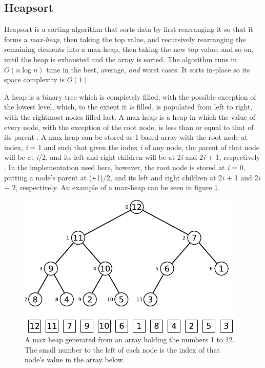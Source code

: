 \documentclass[12pt, a4paper]{article}
\begin{document}
\subsection{Heapsort}\label{sec:heapsort}

Heapsort is a sorting algorithm that sorts data by first rearranging it so that it forms a \emph{max-heap}, then taking the top value, and recursively rearranging the remaining elements into a max-heap, then taking the new top value, and so on, until the heap is exhausted and the array is sorted. The algorithm runs in $O(n\log n)$ time in the best, average, \emph{and} worst cases. It sorts in-place so its space complexity is $O(1)$ \autocite[129]{cormen01}.

A heap is a binary tree which is completely filled, with the possible exception of the lowest level, which, to the extent it  \emph{is} filled, is populated from left to right, with the rightmost nodes filled last. A max-heap is a heap in which the value of every node, with the exception of the root node, is less than or equal to that of its parent \autocite[127-129]{cormen01}. A max-heap can be stored as 1-based array with the root node at index, \emph{i} = 1 and such that given the index \emph{i} of any node, the parent of that node will be at \emph{i}/2, and its left and right children will be at 2\emph{i} and 2\emph{i} + 1, respectively \autocites[128]{cormen01}[148]{bentley:pearls}. In the implementation used here, however, the root node is stored at \emph{i} = 0, putting a node's parent at (\emph{i}-1)/2, and its left and right children at 2\emph{i} + 1 and 2\emph{i} + 2, respectively. An example of a max-heap can be seen in figure \ref{fig:heap}.


\begin{figure}
    \centering
    \includegraphics{heap.pdf}
    \caption{\label{fig:heap}A max heap generated from an array holding the numbers 1 to 12. The small number to the left of each node is the index of that node's value in the array below.}
\end{figure}
\end{document}
